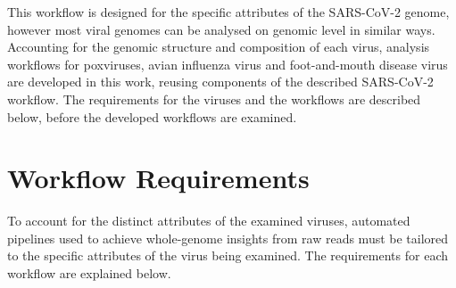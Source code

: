This workflow is designed for the specific attributes of the \ac{SARS-CoV-2} genome, however most viral genomes can be analysed on genomic level in similar ways. Accounting for the genomic structure and composition of each virus, analysis workflows for poxviruses, avian influenza virus and foot-and-mouth disease virus are developed in this work, reusing components of the described \ac{SARS-CoV-2} workflow. The requirements for the viruses and the workflows are described below, before the developed workflows are examined.

\section{Workflow Requirements}
To account for the distinct attributes of the examined viruses, automated pipelines used to achieve whole-genome insights from raw reads must be tailored to the specific attributes of the virus being examined. The requirements for each workflow are explained below.

